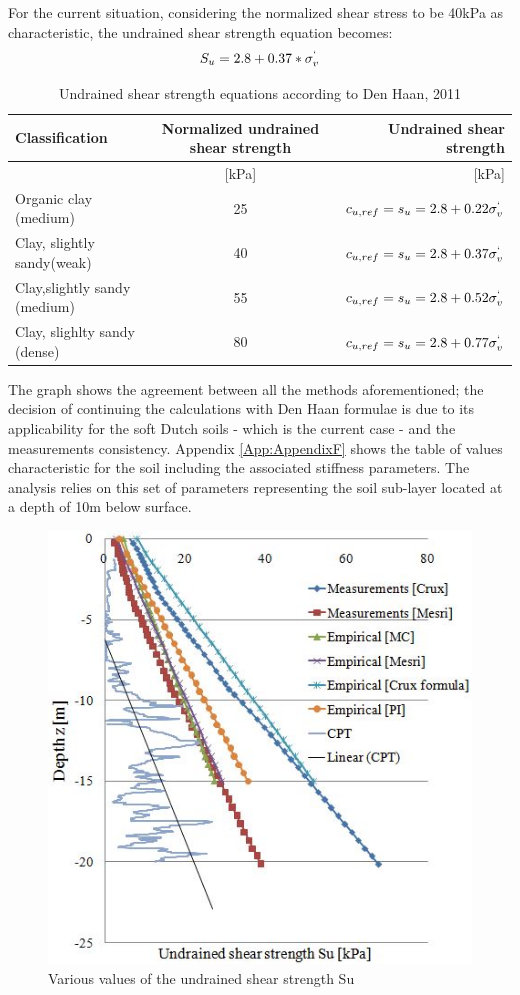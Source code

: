 \documentclass[11pt,a4paper]{report}
\begin{document}
For the current situation, considering the normalized shear stress to be 40kPa as characteristic, the undrained shear strength equation becomes:
\begin{equation}
	S_u=2.8+0.37*\sigma^`_v
\end{equation}

\begin{table}[h!]
	\centering
	\begin{tabular}{|l|c|r|}
		\hline Classification       &      Normalized undrained shear strength   &  Undrained shear strength\\
		\hline [-]  &  [kPa]  & [kPa]   \\ 
		\hline Organic clay (medium)    & 25 &  $c_{u,ref} =s_u=2.8+0.22\sigma^`_v$ \\ 
		\hline Clay, slightly sandy(weak)  & 40  &   $c_{u,ref} =s_u=2.8+0.37\sigma^`_v$   \\ 
		\hline Clay,slightly sandy (medium) &  55  &  $c_{u,ref} =s_u=2.8+0.52\sigma^`_v$     \\ 
		\hline Clay, slighlty sandy (dense) & 80  &  $c_{u,ref} =s_u=2.8+0.77\sigma^`_v$     \\ 
		\hline
	\end{tabular}

	\caption{Undrained shear strength equations according to Den Haan, 2011 \cite{den2011ongedraineerde}}
	\label{DenHaan_param}
\end{table}

The graph shows the agreement between all the methods aforementioned; the decision of continuing the calculations with Den Haan \cite{den2011ongedraineerde} formulae is due to its applicability for the soft Dutch soils - which is the current case - and the measurements consistency. Appendix \ref{App:AppendixF} shows the table of values characteristic for the soil including the associated stiffness parameters. The analysis relies on this set of parameters representing the soil sub-layer located at a depth of 10m below surface.

\begin{figure}[h!]
	\centering
	\includegraphics[width=0.7\linewidth]{"Su"}
	\caption{Various values of the undrained shear strength Su}
	\label{Su}
\end{figure}
\end{document}
